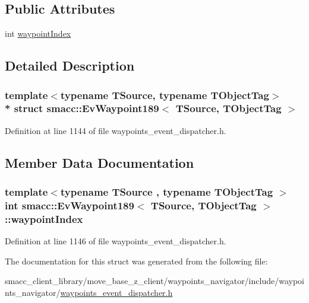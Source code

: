 \subsection*{Public Attributes}
\begin{DoxyCompactItemize}
\item 
int \hyperlink{structsmacc_1_1EvWaypoint189_a53a62adb6041b76c4871783eaa1b5697}{waypoint\+Index}
\end{DoxyCompactItemize}


\subsection{Detailed Description}
\subsubsection*{template$<$typename T\+Source, typename T\+Object\+Tag$>$\\*
struct smacc\+::\+Ev\+Waypoint189$<$ T\+Source, T\+Object\+Tag $>$}



Definition at line 1144 of file waypoints\+\_\+event\+\_\+dispatcher.\+h.



\subsection{Member Data Documentation}
\subsubsection[{\texorpdfstring{waypoint\+Index}{waypointIndex}}]{\setlength{\rightskip}{0pt plus 5cm}template$<$typename T\+Source , typename T\+Object\+Tag $>$ int {\bf smacc\+::\+Ev\+Waypoint189}$<$ T\+Source, T\+Object\+Tag $>$\+::waypoint\+Index}\hypertarget{structsmacc_1_1EvWaypoint189_a53a62adb6041b76c4871783eaa1b5697}{}\label{structsmacc_1_1EvWaypoint189_a53a62adb6041b76c4871783eaa1b5697}


Definition at line 1146 of file waypoints\+\_\+event\+\_\+dispatcher.\+h.



The documentation for this struct was generated from the following file\+:\begin{DoxyCompactItemize}
\item 
smacc\+\_\+client\+\_\+library/move\+\_\+base\+\_\+z\+\_\+client/waypoints\+\_\+navigator/include/waypoints\+\_\+navigator/\hyperlink{waypoints__event__dispatcher_8h}{waypoints\+\_\+event\+\_\+dispatcher.\+h}\end{DoxyCompactItemize}
